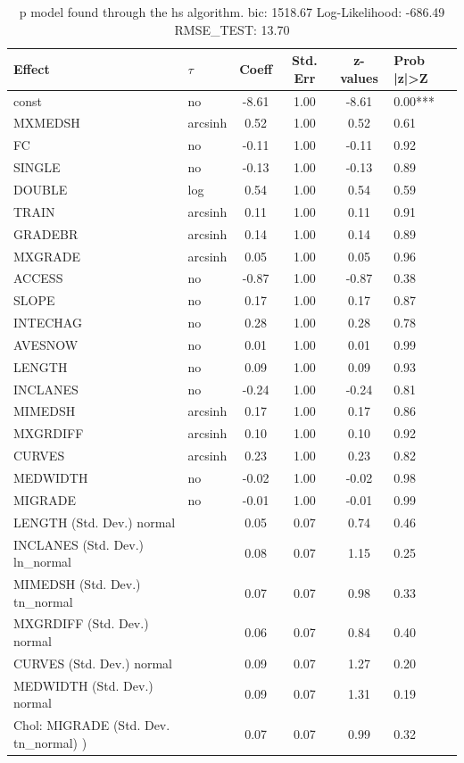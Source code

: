 \begin{table}
	\caption{p model found through the hs algorithm. bic: 1518.67 Log-Likelihood: -686.49 RMSE_TEST: 13.70}
	\begin{center}
		\begin{tabular}{|l|l|c|c|c|l|}
			\hline
			Effect & $\tau$ & Coeff & Std. Err & z-values & Prob |z|>Z \\
			\hline
			const & no & -8.61 & 1.00 & -8.61 & 0.00*** \\
			\hline
			MXMEDSH & arcsinh & 0.52 & 1.00 & 0.52 & 0.61 \\
			\hline
			FC & no & -0.11 & 1.00 & -0.11 & 0.92 \\
			\hline
			SINGLE & no & -0.13 & 1.00 & -0.13 & 0.89 \\
			\hline
			DOUBLE & log & 0.54 & 1.00 & 0.54 & 0.59 \\
			\hline
			TRAIN & arcsinh & 0.11 & 1.00 & 0.11 & 0.91 \\
			\hline
			GRADEBR & arcsinh & 0.14 & 1.00 & 0.14 & 0.89 \\
			\hline
			MXGRADE & arcsinh & 0.05 & 1.00 & 0.05 & 0.96 \\
			\hline
			ACCESS & no & -0.87 & 1.00 & -0.87 & 0.38 \\
			\hline
			SLOPE & no & 0.17 & 1.00 & 0.17 & 0.87 \\
			\hline
			INTECHAG & no & 0.28 & 1.00 & 0.28 & 0.78 \\
			\hline
			AVESNOW & no & 0.01 & 1.00 & 0.01 & 0.99 \\
			\hline
			LENGTH & no & 0.09 & 1.00 & 0.09 & 0.93 \\
			\hline
			INCLANES & no & -0.24 & 1.00 & -0.24 & 0.81 \\
			\hline
			MIMEDSH & arcsinh & 0.17 & 1.00 & 0.17 & 0.86 \\
			\hline
			MXGRDIFF & arcsinh & 0.10 & 1.00 & 0.10 & 0.92 \\
			\hline
			CURVES & arcsinh & 0.23 & 1.00 & 0.23 & 0.82 \\
			\hline
			MEDWIDTH & no & -0.02 & 1.00 & -0.02 & 0.98 \\
			\hline
			MIGRADE & no & -0.01 & 1.00 & -0.01 & 0.99 \\
			\hline
			LENGTH (Std. Dev.) normal &  & 0.05 & 0.07 & 0.74 & 0.46 \\
			\hline
			INCLANES (Std. Dev.) ln_normal &  & 0.08 & 0.07 & 1.15 & 0.25 \\
			\hline
			MIMEDSH (Std. Dev.) tn_normal &  & 0.07 & 0.07 & 0.98 & 0.33 \\
			\hline
			MXGRDIFF (Std. Dev.) normal &  & 0.06 & 0.07 & 0.84 & 0.40 \\
			\hline
			CURVES (Std. Dev.) normal &  & 0.09 & 0.07 & 1.27 & 0.20 \\
			\hline
			MEDWIDTH (Std. Dev.) normal &  & 0.09 & 0.07 & 1.31 & 0.19 \\
			\hline
			 Chol: MIGRADE (Std. Dev. tn_normal) ) &  & 0.07 & 0.07 & 0.99 & 0.32 \\
			\hline
		\end{tabular}
	\end{center}
\end{table}